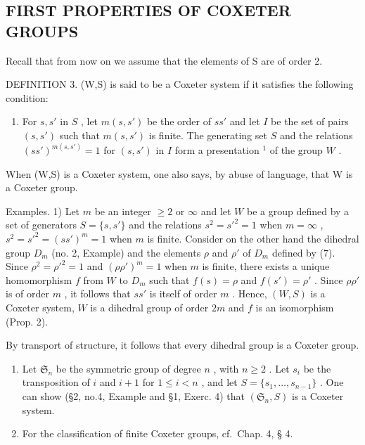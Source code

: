 \subsection{FIRST PROPERTIES OF COXETER GROUPS}

Recall that from now on we assume that the elements of S are of order 2.

DEFINITION 3. (W,S) is said to be a Coxeter system if it satisfies the following condition:

\begin{enumerate}
\def\labelenumi{(\Alph{enumi})}
\setcounter{enumi}{2}
\tightlist
\item
  For \(s, s'\) in \(S\) , let \(m(s, s')\) be the order of \(ss'\) and let \(I\) be the set of pairs \((s, s')\) such that \(m(s, s')\) is finite. The generating set \(S\) and the relations \((ss')^{m(s, s')} = 1\) for \((s, s')\) in \(I\) form a presentation \(^{1}\) of the group \(W\) .
\end{enumerate}

When (W,S) is a Coxeter system, one also says, by abuse of language, that W is a Coxeter group.

Examples. 1) Let \(m\) be an integer \(\geqslant 2\) or \(\infty\) and let \(W\) be a group defined by a set of generators \(S = \{s, s'\}\) and the relations \(s^2 = s'^2 = 1\) when \(m = \infty\) , \(s^2 = s'^2 = (ss')^m = 1\) when \(m\) is finite. Consider on the other hand the dihedral group \(D_m\) (no. 2, Example) and the elements \(\rho\) and \(\rho'\) of \(D_m\) defined by (7). Since \(\rho^2 = \rho'^2 = 1\) and \((\rho \rho')^m = 1\) when \(m\) is finite, there exists a unique homomorphism \(f\) from \(W\) to \(D_m\) such that \(f(s) = \rho\) and \(f(s') = \rho'\) . Since \(\rho \rho'\) is of order \(m\) , it follows that \(ss'\) is itself of order \(m\) . Hence, \((W, S)\) is a Coxeter system, \(W\) is a dihedral group of order \(2m\) and \(f\) is an isomorphism (Prop. 2).

By transport of structure, it follows that every dihedral group is a Coxeter group.

\begin{enumerate}
\def\labelenumi{\arabic{enumi})}
\setcounter{enumi}{1}
\item
  Let \(\mathfrak{S}_n\) be the symmetric group of degree \(n\) , with \(n \geqslant 2\) . Let \(s_i\) be the transposition of \(i\) and \(i + 1\) for \(1 \leqslant i < n\) , and let \(S = \{s_1, \ldots, s_{n-1}\}\) . One can show (§2, no.4, Example and §1, Exerc. 4) that \((\mathfrak{S}_n, S)\) is a Coxeter system.
\item
  For the classification of finite Coxeter groups, cf.~Chap. 4, § 4.
\end{enumerate}


